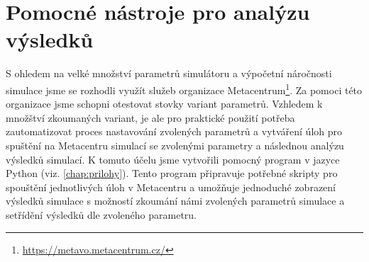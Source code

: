 \section{Pomocné nástroje pro analýzu výsledků}

S ohledem na velké množství parametrů simulátoru a výpočetní náročnosti simulace
jsme se rozhodli využít služeb organizace 
Metacentrum\footnote{\url{https://metavo.metacentrum.cz/}}. Za pomoci
této organizace jsme schopni otestovat stovky variant parametrů.
Vzhledem k množštví zkoumaných variant, je ale pro praktické použití potřeba 
zautomatizovat proces nastavování zvolených parametrů a vytváření úloh pro spuštění na 
Metacentru simulací se zvolenými parametry a následnou analýzu výsledků simulací.
K tomuto účelu jsme vytvořili pomocný program v jazyce Python 
(viz. \cref{chap:prilohy}). Tento program připravuje 
potřebné skripty pro spouštění jednotlivých úloh v Metacentru a 
umožňuje jednoduché zobrazení výsledků simulace s možností zkoumání 
námi zvolených parametrů simulace a setřídění výsledků dle zvoleného parametru.
